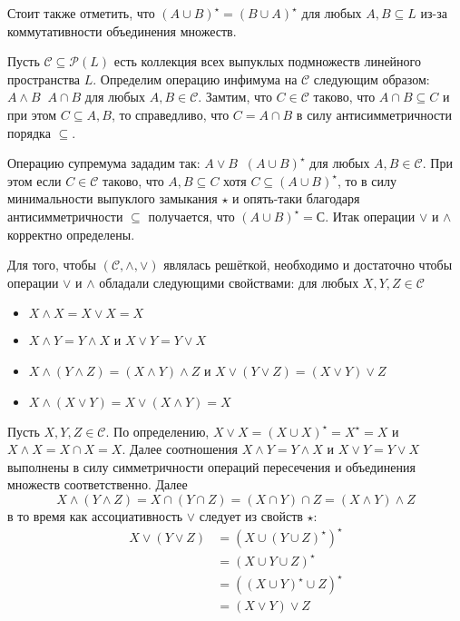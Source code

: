 \documentclass[a4paper]{article}
\newcommand{\brac}[1]{\left ( #1 \right )}
\newcommand{\Ccal}{\mathcal{C}}
\newcommand{\pwr}[1]{\mathcal{P}\brac{#1}}
\newcommand{\defn}{\mathop{\overset{\Delta}{=}}\nolimits}
\begin{document}
Стоит также отметить, что $\brac{A\cup B}^\star = \brac{B\cup A}^\star$ для любых $A,B\subseteq L$ из-за коммутативности объединения множеств.

Пусть $\Ccal\subseteq \pwr{L}$ есть коллекция всех выпуклых подмножеств линейного пространства $L$. Определим операцию инфимума на $\Ccal$ следующим образом: $A\wedge B \defn A\cap B$ для любых $A,B\in \Ccal$. Замтим, что $C\in\Ccal$ таково, что $A\cap B\subseteq C$ и при этом $C\subseteq A,B$, то справедливо, что $C=A\cap B$ в силу антисимметричности порядка $\subseteq$.

Операцию супремума зададим так: $A\vee B \defn \brac{A\cup B}^\star$ для любых $A,B\in \Ccal$. При этом если $C\in \Ccal$ таково, что $A, B\subseteq C$ хотя $C\subseteq \brac{A\cup B}^\star$, то в силу минимальности выпуклого замыкания $\star$ и опять-таки благодаря антисимметричности $\subseteq$ получается, что $\brac{A\cup B}^\star=С$. Итак операции $\vee$ и $\wedge$ корректно определены.

Для того, чтобы $\brac{\Ccal, \wedge, \vee}$ являлась решёткой, необходимо и достаточно чтобы операции $\vee$ и $\wedge$ обладали следующими свойствами: для любых $X,Y,Z\in \Ccal$ \begin{itemize}
	\item $X\wedge X = X\vee X = X$
	\item $X\wedge Y = Y\wedge X$ и $X\vee Y = Y\vee X$
	\item $X\wedge \brac{Y\wedge Z} = \brac{X\wedge Y}\wedge Z$ и $X\vee \brac{Y\vee Z} = \brac{X\vee Y}\vee Z$
	\item $X\wedge \brac{X\vee Y} = X\vee \brac{X\wedge Y} = X$
\end{itemize}

Пусть $X,Y,Z\in \Ccal$. По определению, $X\vee X = \brac{X\cup X}^\star = X^\star = X$ и $X\wedge X = X\cap X = X$. Далее соотношения $X\wedge Y = Y\wedge X$ и $X\vee Y = Y\vee X$ выполнены в силу симметричности операций пересечения и объединения множеств соответственно. Далее \[X\wedge \brac{Y\wedge Z} = X\cap \brac{Y\cap Z} = \brac{X\cap Y}\cap Z = \brac{X\wedge Y}\wedge Z\] в то время как ассоциативность $\vee$ следует из свойств $\star$:\begin{align*}
X\vee \brac{Y\vee Z} &= \brac{X\cup \brac{Y\cup Z}^\star}^\star \\ &=\brac{X\cup Y\cup Z}^\star \\ &=\brac{\brac{X\cup Y}^\star \cup Z}^\star \\ &=\brac{X\vee Y}\vee Z\end{align*}
\end{document}

